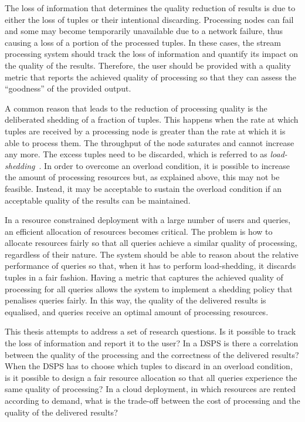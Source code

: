 The loss of information that determines the quality reduction of results is due to either the loss of
tuples or their intentional discarding.
Processing nodes can fail and some may become temporarily unavailable due to a network failure,
thus causing a loss of a portion of the processed tuples. 
In these cases, the stream processing system should track the loss of information and
quantify its impact on the quality of the results. Therefore, the user should be provided with a quality
metric that reports the achieved quality of processing so that they can assess the ``goodness'' of
the provided output.

A common reason that leads to the reduction of processing quality is the deliberated
shedding of a fraction of tuples. This happens when the rate at which tuples are received by a
processing node is greater than the rate at which it is able to process them. The throughput of the node
saturates and cannot increase any more. The excess tuples need
to be discarded, which is referred to as \emph{\mbox{load-shedding}}~\cite{load-shedding}.
In order to overcome an overload condition, it is possible to increase the amount of processing
resources but, as explained above, this may not be feasible. Instead, it may be acceptable to sustain
the overload condition if an acceptable quality of the results can be maintained.

In a resource constrained deployment with a large number of users and queries, an efficient allocation of
resources becomes critical. The problem is how to allocate resources fairly so that all queries achieve
a similar quality of processing, regardless of their nature. The system should be able to reason
about the relative performance of queries so that, when it has to perform \mbox{load-shedding}, it
discards tuples in a fair fashion. Having a metric that captures the achieved quality of processing for
all queries allows the system to implement a shedding policy that penalises queries fairly.
In this way, the quality of the delivered results is equalised, and queries receive an optimal amount of
processing resources.%

This thesis attempts to address a set of research questions.
Is it possible to track the loss of information and report it to the user? In a DSPS is there a
correlation between the quality of the processing and the correctness of the delivered results? When the
DSPS has to choose which tuples to discard in an overload condition, is it possible to design a fair
resource allocation so that all queries experience the same quality of processing? In a cloud deployment, in which
resources are rented according to demand, what is the trade-off between the cost of processing and the
quality of the delivered results? 

